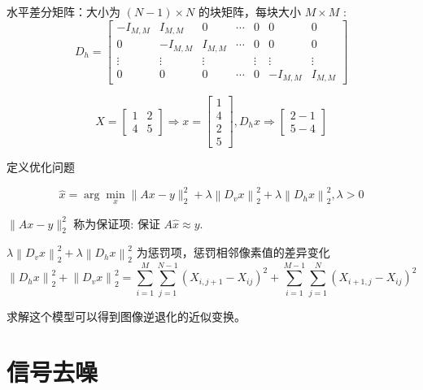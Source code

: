 \begin{definition}
    水平差分矩阵：大小为 $ (N-1) \times N $ 的块矩阵，每块大小 $ M \times M $ :
$$
D_{h}=\left[\begin{array}{ccccccc}
-I_{M, M} & I_{M, M} & 0 & \cdots & 0 & 0 & 0 \\
0 & -I_{M, M} & I_{M, M} & \cdots & 0 & 0 & 0 \\
\vdots & \vdots & \vdots & & \vdots & \vdots & \vdots \\
0 & 0 & 0 & \cdots & 0 & -I_{M, M} & I_{M, M}
\end{array}\right]
$$
\end{definition}

\begin{example}
    $$ X=\left[\begin{array}{ll}1 & 2 \\ 4 & 5\end{array}\right] \Rightarrow x=\left[\begin{array}{l}1 \\ 4 \\ 2 \\ 5\end{array}\right], D_{h} x \Rightarrow\left[\begin{array}{l}2-1 \\ 5-4\end{array}\right] $$
\end{example}

定义优化问题

\begin{problem}
     $$
\hat{x}=\arg \min _{x}\|A x-y\|_{2}^{2}+\lambda\left\|D_{v} x\right\|_{2}^{2}+\lambda\left\|D_{h} x\right\|_{2}^{2}, \lambda>0
$$

$ \|A x-y\|_{2}^{2} $ 称为保证项: 保证 $ A \hat{x} \approx y $.

$ \lambda\left\|D_{v} x\right\|_{2}^{2}+\lambda\left\|D_{h} x\right\|_{2}^{2} $ 为惩罚项，惩罚相邻像素值的差异变化
$$
\left\|D_{h} x\right\|_{2}^{2}+\left\|D_{v} x\right\|_{2}^{2}=\sum_{i=1}^{M} \sum_{j=1}^{N-1}\left(X_{i, j+1}-X_{i j}\right)^{2}+\sum_{i=1}^{M-1} \sum_{j=1}^{N}\left(X_{i+1, j}-X_{i j}\right)^{2}
$$
\end{problem}

求解这个模型可以得到图像逆退化的近似变换。





\section{信号去噪}

